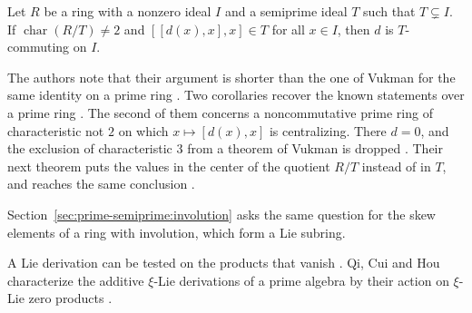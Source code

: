 \begin{theorem}\label{thm:prime:sandhu-engel}
Let $R$ be a ring with a nonzero ideal $I$ and a semiprime ideal $T$ such that
$T\subsetneq I$. If $\operatorname{char}(R/T)\neq 2$ and $[[d(x),x],x]\in T$ for
all $x\in I$, then $d$ is $T$-commuting on $I$.
\end{theorem}

The authors note that their argument is shorter than the one of Vukman for the
same identity on a prime ring \cite[p.~2]{SandhuRehman2025}. Two corollaries
recover the known statements over a prime ring \cite[p.~4]{SandhuRehman2025}.
The second of them concerns a noncommutative prime ring of characteristic not
$2$ on which $x\mapsto[d(x),x]$ is centralizing. There $d=0$, and the
exclusion of characteristic $3$ from a theorem of Vukman is dropped
\cite[Corollary~2.7, p.~6]{SandhuRehman2025}. Their next theorem puts the
values in the center of the quotient $R/T$ instead of in $T$, and reaches the
same conclusion \cite[Theorem~2.5, p.~5]{SandhuRehman2025}.

Section~\ref{sec:prime-semiprime:involution} asks the same question for the
skew elements of a ring with involution, which form a Lie subring.

A Lie derivation can be tested on the products that vanish
\cite[pp.~669--682]{QiCuiHou2011XiLie}. Qi, Cui and Hou characterize the
additive $\xi$-Lie derivations of a prime algebra by their action on $\xi$-Lie
zero products \cite[pp.~669--682]{QiCuiHou2011XiLie}.

